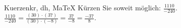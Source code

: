 \begin{MAufgabe}{Kuerzen}{kr, dh, MaTeX}
K\"urzen Sie soweit m\"oglich: $\frac{1110}{-240}$.\\ 
\ifLsg\MLoesung
\quad $\frac{1110}{-240}=\frac{(30)\cdot(37)}{(30)\cdot(-8)}=\frac{37}{-8}=\frac{-37}{8}$.\else\relax\fi
 \end{MAufgabe}
